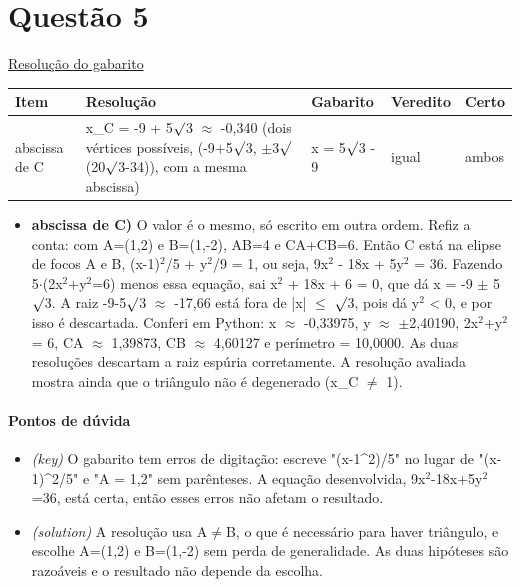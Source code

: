 \documentclass{article}%
\begin{document}
\section*{Questão 5}%
\href{https://poliedroresolve.sistemapoliedro.com.br/vestibulares/ita/2027/ita-2-fase-dia-1-20-10-2026-2-fase-dia-1/dissertativa-5-matematica-2-fase-dia-1-ita-2027}{Resolução do gabarito}\par\smallskip%
\begin{longtable}{@{}p{} p{} p{} p{} p{}@{}}\toprule Item & Resolução & Gabarito & Veredito & Certo \\ \midrule
abscissa de C & x\_C = {-}9 + 5$\surd$3 $\approx$ {-}0,340 (dois vértices possíveis, (-9+5$\surd$3, $\pm$3$\surd$(20$\surd$3-34)), com a mesma abscissa) & x = 5$\surd$3 - 9 & igual & ambos \\
\bottomrule\end{longtable}%
\begin{itemize}%
\item%
\textbf{abscissa de C)} O valor é o mesmo, só escrito em outra ordem. Refiz a conta: com A=(1,2) e B=(1,-2), AB=4 e CA+CB=6. Então C está na elipse de focos A e B, (x-1)$^2$/5 + y$^2$/9 = 1, ou seja, 9x$^2$ - 18x + 5y$^2$ = 36. Fazendo 5$\cdot$(2x$^2$+y$^2$=6) menos essa equação, sai x$^2$ + 18x + 6 = 0, que dá x = -9 $\pm$ 5$\surd$3. A raiz -9-5$\surd$3 $\approx$ -17,66 está fora de |x| $\leq$ $\surd$3, pois dá y$^2$ < 0, e por isso é descartada. Conferi em Python: x $\approx$ -0,33975, y $\approx$ $\pm$2,40190, 2x$^2$+y$^2$ = 6, CA $\approx$ 1,39873, CB $\approx$ 4,60127 e perímetro = 10,0000. As duas resoluções descartam a raiz espúria corretamente. A resolução avaliada mostra ainda que o triângulo não é degenerado (x\_C $\neq$ 1).%
\end{itemize}%
\paragraph{Pontos de dúvida}%
\begin{itemize}%
\item%
\textit{(key)} O gabarito tem erros de digitação: escreve "(x{-}1\^{}2)/5" no lugar de "(x{-}1)\^{}2/5" e "A = 1,2" sem parênteses. A equação desenvolvida, 9x$^2$-18x+5y$^2$=36, está certa, então esses erros não afetam o resultado.%
\item%
\textit{(solution)} A resolução usa A$\neq$B, o que é necessário para haver triângulo, e escolhe A=(1,2) e B=(1,-2) sem perda de generalidade. As duas hipóteses são razoáveis e o resultado não depende da escolha.%
\end{itemize}%
\end{document}
